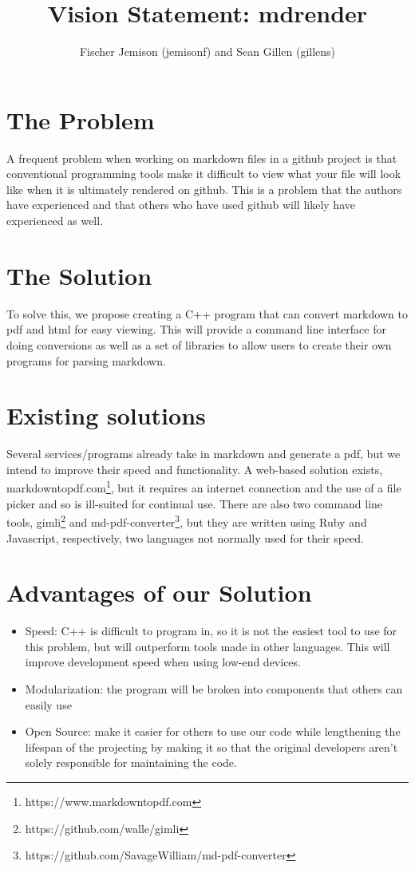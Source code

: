 \documentclass[12pt]{article}
\title{Vision Statement: mdrender}
\author{Fischer Jemison (jemisonf) and Sean Gillen (gillens)}
\begin{document}
\maketitle
\tableofcontents


\section{The Problem}
A frequent problem when working on markdown files in a github project is that conventional programming tools make it difficult to view what your file will look like when it is ultimately rendered on github. This is a problem that the authors have experienced and that others who have used github will likely have experienced as well.
\section{The Solution}
To solve this, we propose creating a C++ program that can convert markdown to pdf and html for easy viewing. This will provide a command line interface for doing conversions as well as a set of libraries to allow users to create their own programs for parsing markdown.
\section{Existing solutions}
Several services/programs already take in markdown and generate a pdf, but we intend to improve their speed and functionality. A web-based solution exists, markdowntopdf.com\footnote{https://www.markdowntopdf.com}, but it requires an internet connection and the use of a file picker and so is ill-suited for continual use.
There are also two command line tools, gimli\footnote{https://github.com/walle/gimli} and md-pdf-converter\footnote{https://github.com/SavageWilliam/md-pdf-converter}, but they are written using Ruby and Javascript, respectively, two languages not normally used for their speed.
\section{Advantages of our Solution}
\begin{itemize}
	\item Speed: C++ is difficult to program in, so it is not the easiest tool to use for this problem, but will outperform tools made in other languages. This will improve development speed when using low-end devices.
	\item Modularization: the program will be broken into components that others can easily use
	\item Open Source: make it easier for others to use our code while lengthening the lifespan of the projecting by making it so that the original developers aren't solely responsible for maintaining the code.
\end{itemize}
\end{document}
